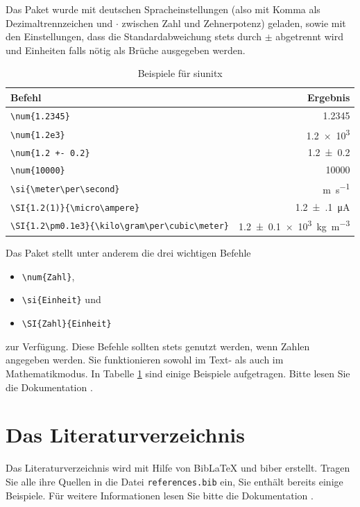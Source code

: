 Das Paket wurde mit deutschen Spracheinstellungen (also mit Komma als Dezimaltrennzeichen und $\cdot$ zwischen Zahl und Zehnerpotenz) geladen, sowie mit den Einstellungen, dass die Standardabweichung stets durch $\pm$ abgetrennt wird und Einheiten falls nötig als Brüche ausgegeben werden.

\begin{table}
    \centering
    \caption{Beispiele für siunitx}
    \label{tab:si}
    \begin{tabular}{l r}
        \toprule
        Befehl     &   Ergebnis \\
        \midrule
        \verb+\num{1.2345}+ & \num{1.2345} \\
        \verb+\num{1.2e3}+ & \num{1.2e3} \\
        \verb_\num{1.2 +- 0.2}_ & \num{1.2+-0.2} \\
        \verb+\num{10000}+ & \num{10000} \\
        \verb+\si{\meter\per\second}+ & \si{\meter\per\second} \\
        \verb+\SI{1.2(1)}{\micro\ampere}+ & \SI{1.2(1)}{\micro\ampere} \\
        \verb+\SI{1.2\pm0.1e3}{\kilo\gram\per\cubic\meter}+ & \SI{1.2\pm0.1e3}{\kilo\gram\per\cubic\meter} \\
        \bottomrule 
    \end{tabular}
\end{table}

Das Paket stellt unter anderem die drei wichtigen Befehle
\begin{itemize}
    \item \texttt{\textbackslash num\{Zahl\}},
    \item \texttt{\textbackslash si\{Einheit\}} und
    \item \texttt{\textbackslash SI\{Zahl\}\{Einheit\}}
\end{itemize}
zur Verfügung.
Diese Befehle sollten stets genutzt werden, wenn Zahlen angegeben werden. 
Sie funktionieren sowohl im Text- als auch im Mathematikmodus.
In Tabelle \ref{tab:si} sind einige Beispiele aufgetragen. Bitte lesen Sie die Dokumentation \cite{siunitx}.

\section{Das Literaturverzeichnis}

Das Literaturverzeichnis wird mit Hilfe von BibLaTeX und biber erstellt.
Tragen Sie alle ihre Quellen in die Datei \texttt{references.bib} ein, Sie enthält bereits
einige Beispiele. Für weitere Informationen lesen Sie bitte die Dokumentation \cite{biblatex}.

